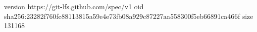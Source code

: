 version https://git-lfs.github.com/spec/v1
oid sha256:23282f760fc88113815a59e4e73fb08a929c87227aa558300f5eb66891ca466f
size 131168
